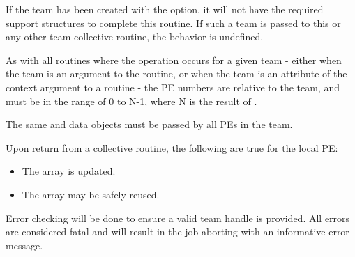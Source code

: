 \begin{apidefinition}
{    If the team has been created with the  option,
    it will not have the required support structures to complete this routine. If
    such a team is passed to this or any other team collective routine, the behavior
    is undefined.

    As with all \openshmem routines where the operation occurs for a given team -
    either when the team is an argument to the routine, or when the team is an attribute
    of the context argument to a routine - the \ac{PE} numbers are relative to the team,
    and must be in the range of 0 to N-1, where N is the result of .

    The same \dest{} and \source{} data objects must be passed by all \acp{PE}
    in the team.

    Upon return from a collective routine, the following are true for the local
    \ac{PE}:
    \begin{itemize}
    \item The \dest{} array is updated.
    \item The \source{} array may be safely reused.
    \end{itemize}

    Error checking will be done to ensure a valid team handle is provided.
    All errors are considered fatal and will result in the job aborting
    with an informative error message.
}





\begin{apiexamples}

\end{apiexamples}

\end{apidefinition}
